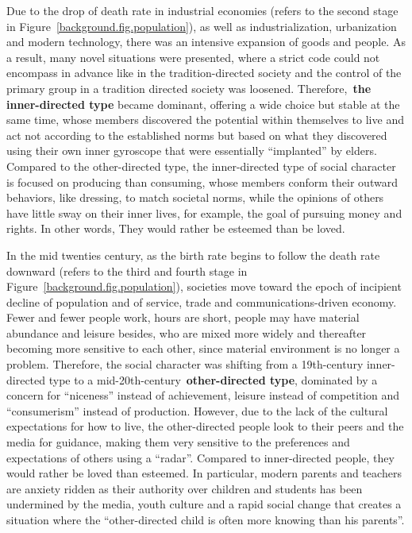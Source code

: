 Due to the drop of death rate in industrial economies (refers to the second stage in Figure~\ref{background.fig.population}), as well as industrialization, urbanization and modern technology, there was an intensive expansion of goods and people. As a result, many novel situations were presented, where a strict code could not encompass in advance like in the tradition-directed society and the control of the primary group in a tradition directed society was loosened. Therefore,~\textbf{the inner-directed type} became dominant, offering a wide choice but stable at the same time, whose members discovered the potential within themselves to live and act not according to the established norms but based on what they discovered using their own inner gyroscope that were essentially ``implanted'' by elders. Compared to the other-directed type, the inner-directed type of social character is focused on producing than consuming, whose members conform their outward behaviors, like dressing, to match societal norms, while the opinions of others have little sway on their inner lives, for example, the goal of pursuing money and rights. In other words, They would rather be esteemed than be loved.

In the mid twenties century, as the birth rate begins to follow the death rate downward (refers to the third and fourth stage in Figure~\ref{background.fig.population}), societies move toward the epoch of incipient decline of population and of service, trade and communications-driven economy. Fewer and fewer people work, hours are short, people may have material abundance and leisure besides, who are mixed more widely and thereafter becoming more sensitive to each other, since material environment is no longer a problem. Therefore, the social character was shifting from a 19th-century inner-directed type to a mid-20th-century~\textbf{other-directed type}, dominated by a concern for ``niceness'' instead of achievement, leisure instead of competition and ``consumerism'' instead of production. However, due to the lack of the cultural expectations for how to live, the other-directed people look to their peers and the media for guidance, making them very sensitive to the preferences and expectations of others using a ``radar''. Compared to inner-directed people, they would rather be loved than esteemed. In particular, modern parents and teachers are anxiety ridden as their authority over children and students has been undermined by the media, youth culture and a rapid social change that creates a situation where the ``other-directed child is often more knowing than his parents''. 


			

			
		

